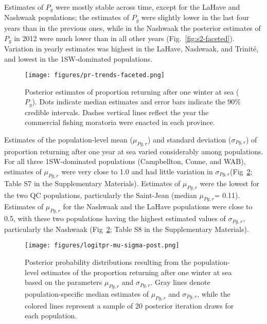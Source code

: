 \documentclass[12pt]{article}
\newcommand{\Pg}{$P_g$\xspace}
\newcommand{\prmu}{$\mu_{Pg,r}$\xspace}
\newcommand{\prsig}{$\sigma_{Pg,r}$\xspace}
\begin{document}
Estimates of \Pg were mostly stable across time, except for the LaHave and
Nashwaak populations; the estimates of \Pg were slightly lower in the last
four years than in the previous ones, while in the Nashwaak the posterior
estimates of \Pg in 2012 were much lower than in all other years
(Fig.~\ref{fig:s2-faceted}). Variation in yearly estimates was highest in the
LaHave, Nashwaak, and Trinit\'{e}, and lowest in the 1SW-dominated
populations.

\begin{figure}[htbp] \centering
    \texttt{[image: figures/pr-trends-faceted.png]}
    \caption{Posterior estimates of proportion returning after one winter at sea (\Pg).
 Dots indicate median estimates and error
        bars indicate the 90\% credible intervals. Dashes vertical lines reflect the year the commercial fishing moratoria were enacted
    in each province.} \label{fig:pr-faceted} 
\end{figure}

Estimates of the population-level mean (\prmu) and standard deviation (\prsig) of proportion returning after one year at sea varied considerably among populations. 
For all
three 1SW-dominated populations (Campbellton, Conne, and WAB), estimates of \prmu
were very close to 1.0 and had little variation in \prsig (Fig~\ref{fig:prmu-post}; Table S7 in the Supplementary Materials).
Estimates of \prmu were the lowest for the two QC populations, particularly the Saint-Jean (median \prmu = 0.11).
Estimates of \prmu for the Nashwaak and the LaHave populations were close to 0.5, with these two populations having 
the highest estimated values of \prsig, particularly the Nashwaak (Fig~\ref{fig:prmu-post};  Table S8 in the Supplementary Materials).

% 

% 



\begin{figure}[htbp] \centering
    \texttt{[image: figures/logitpr-mu-sigma-post.png]}
    \caption{Posterior probability distributions resulting from the population-level estimates of the proportion returning after one winter at sea based on
        the parameters \prmu and \prsig. Gray lines denote population-specific median estimates of \prmu and \prsig, while
       the colored lines represent a sample of 20 posterior iteration draws for each population.} 
   \label{fig:prmu-post} 
\end{figure}
\end{document}
